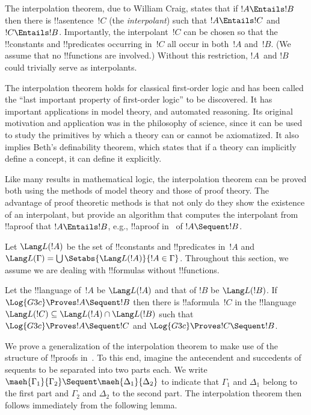 \documentclass[../../../include/open-logic-section]{subfiles}
\begin{document}


The interpolation theorem, due to William Craig, states that if $!A
\Entails !B$ then there is !!a{sentence}~$!C$ (the \emph{interpolant})
such that $!A \Entails !C$ and $!C \Entails !B$. Importantly, the
interpolant~$!C$ can be chosen so that the !!{constant}s and
!!{predicate}s occurring in~$!C$ all occur in both~$!A$ and~$!B$. (We
assume that no !!{function}s are involved.) Without this restriction,
$!A$~and $!B$ could trivially serve as interpolants.

The interpolation theorem holds for classical first-order logic and
has been called the ``last important property of first-order logic''
to be discovered. It has important applications in model theory, and
automated reasoning. Its original motivation and application was in
the philosophy of science, since it can be used to study the
primitives by which a theory can or cannot be axiomatized. It also
implies Beth's definability theorem, which states that if a theory can
implicitly define a concept, it can define it explicitly.

Like many results in mathematical logic, the interpolation theorem can
be proved both using the methods of model theory and those of proof
theory. The advantage of proof theoretic methods is that not only do
they show the existence of an interpolant, but provide an algorithm
that computes the interpolant from !!a{proof} that $!A \Entails !B$,
e.g., !!a{proof} in~ of $!A \Sequent !B$.

Let $\Lang L(!A)$ be the set of !!{constant}s and !!{predicate}s
in~$!A$ and $\Lang L(\Gamma) = \bigcup \Setabs{\Lang L(!A)}{!A \in
\Gamma}$. Throughout this section, we assume we are dealing with
!!{formula}s without !!{function}s.

\begin{thm}
Let the !!{language} of~$!A$ be $\Lang L(!A)$ and that of $!B$ be
$\Lang L(!B)$. If $\Log{G3c} \Proves !A \Sequent !B$ then there is
!!a{formula}~$!C$ in the !!{language}~$\Lang L(!C) \subseteq \Lang
L(!A) \cap \Lang L(!B)$ such that $\Log{G3c} \Proves !A \Sequent !C$
and $\Log{G3c} \Proves !C \Sequent !B$.
\end{thm}

We prove a generalization of the interpolation theorem to make use of
the structure of !!{proof}s in~. To this end, imagine the
antecendent and succedents of sequents to be separated into two parts
each. We write $\maeh{\Gamma_1}{\Gamma_2} \Sequent
\maeh{\Delta_1}{\Delta_2}$ to indicate that $\Gamma_1$ and $\Delta_1$
belong to the first part and $\Gamma_2$ and $\Delta_2$ to the second
part. The interpolation theorem then follows immediately from the
following lemma.
\end{document}
